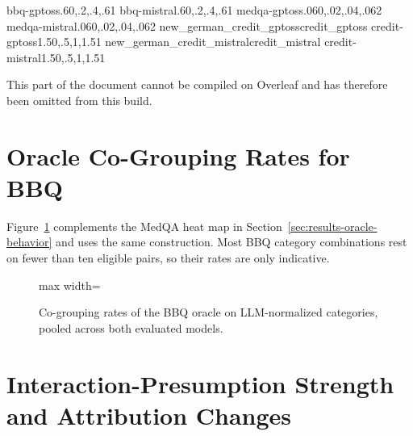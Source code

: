     {bbq-gptoss}{.6}{0,.2,.4,.6}{1}
    {bbq-mistral}{.6}{0,.2,.4,.6}{1}
    {medqa-gptoss}{.06}{0,.02,.04,.06}{2}
    {medqa-mistral}{.06}{0,.02,.04,.06}{2}
    {new_german_credit_gptoss}{credit_gptoss}%
    {credit-gptoss}{1.5}{0,.5,1,1.5}{1}
    {new_german_credit_mistral}{credit_mistral}%
    {credit-mistral}{1.5}{0,.5,1,1.5}{1}
  \tikzexternaldisable
\else
  \begin{tcolorbox}[
    colback=orange!12,
    colframe=orange!80!black,
    fonttitle=\bfseries,
    title={Compilation warning}
  ]
    This part of the document cannot be compiled on Overleaf and has therefore
    been omitted from this build.
  \end{tcolorbox}
\fi

\section{Oracle Co-Grouping Rates for BBQ}
\label{app:oracle-heatmap-bbq}

Figure~\ref{fig:oracle-heatmap-bbq} complements the MedQA heat map in Section~\ref{sec:results-oracle-behavior} and uses the same construction. Most BBQ category combinations rest on fewer than ten eligible pairs, so their rates are only indicative.

\begin{figure}[H]
  \centering
  \begin{adjustbox}{max width=\textwidth}
    \OracleHeatmapBBQ
  \end{adjustbox}
  \caption[Oracle co-grouping rates for BBQ]{Co-grouping rates of the BBQ oracle on LLM-normalized categories, pooled across both evaluated models.}
  \label{fig:oracle-heatmap-bbq}
\end{figure}

\section{Interaction-Presumption Strength and Attribution Changes}
\label{app:rq1-scatter}

